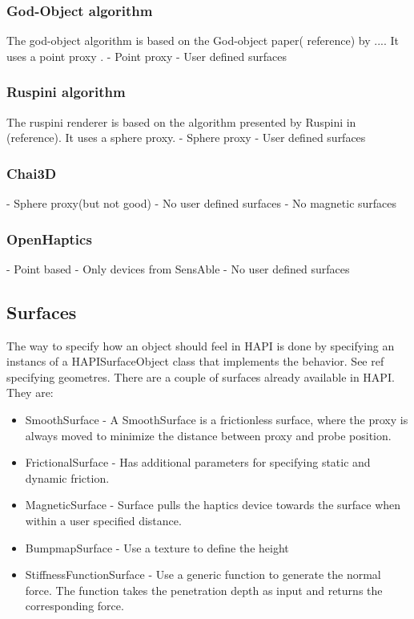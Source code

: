 \subsubsection{God-Object algorithm}
The god-object algorithm is based on the God-object paper( reference)
by .... It uses a point proxy .
- Point proxy
- User defined surfaces

\subsubsection{Ruspini algorithm}
The ruspini renderer is based on the algorithm presented by Ruspini in
(reference). It uses a sphere proxy.
- Sphere proxy
- User defined surfaces


\subsubsection{Chai3D}
- Sphere proxy(but not good)
- No user defined surfaces
- No magnetic surfaces

\subsubsection{OpenHaptics}
- Point based
- Only devices from SensAble
- No user defined surfaces

\subsection{Surfaces}
The way to specify how an object should feel in HAPI is done by
specifying an instancs of a HAPISurfaceObject class that implements
the behavior. See ref specifying geometres. There are a couple of
surfaces already available in HAPI. They are:

\begin{itemize}
\item SmoothSurface - A SmoothSurface is a frictionless surface, where
  the proxy is always moved to minimize the distance between proxy and
  probe position. 
\item FrictionalSurface - Has additional parameters for specifying
  static and dynamic friction.
\item MagneticSurface - Surface pulls the haptics device towards the
  surface when within a user specified distance.
\item BumpmapSurface - Use a texture to define the height 
\item StiffnessFunctionSurface - Use a generic function to generate
  the normal force. The function takes the penetration depth as input
  and returns the corresponding force. 
\end{itemize}

